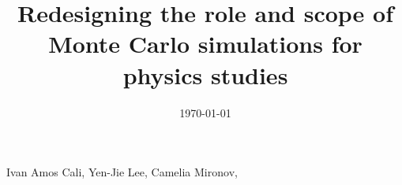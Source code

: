 \begin{titlepage}
\vspace{-.2 cm} 
\date{\today}
\vspace{2 cm}
\title{Redesigning the role and scope of Monte Carlo simulations for physics studies}

\vspace{.2 cm} 
\begin{Authlist}
Ivan Amos Cali\footnotemark[1],
Yen-Jie Lee\footnotemark[1], 
Camelia Mironov\footnotemark[1], 
\end{Authlist}



\end{titlepage}





